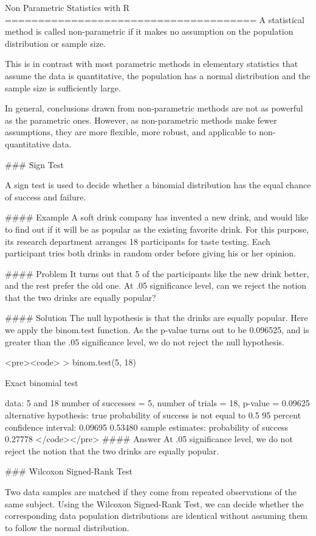 Non Parametric Statistics with R
======================================
A statistical method is called non-parametric if it makes no assumption on the population distribution or sample size.

This is in contrast with most parametric methods in elementary statistics that assume the data is quantitative, the population has a normal distribution and the sample size is sufficiently large.

In general, conclusions drawn from non-parametric methods are not as powerful as the parametric ones. 
However, as non-parametric methods make fewer assumptions, they are more flexible, more robust, and applicable to non-quantitative data.

### Sign Test

A sign test is used to decide whether a binomial distribution has the equal chance of success and failure.

#### Example
A soft drink company has invented a new drink, and would like to find out if it will be as popular as the existing favorite drink. For this purpose, its research department arranges 18 participants for taste testing. Each participant tries both drinks in random order before giving his or her opinion.

#### Problem
It turns out that 5 of the participants like the new drink better, and the rest prefer the old one. At .05 significance level, can we reject the notion that the two drinks are equally popular?

#### Solution
The null hypothesis is that the drinks are equally popular. Here we apply the binom.test function. As the p-value turns out to be 0.096525, and is greater than the .05 significance level, we do not reject the null hypothesis.

<pre><code>
> binom.test(5, 18) 
 
        Exact binomial test 
 
data:  5 and 18 
number of successes = 5, number of trials = 18, 
p-value = 0.09625 
alternative hypothesis: true probability of success is not equal to 0.5 
95 percent confidence interval: 
 0.09695 0.53480 
sample estimates: 
probability of success 
               0.27778
</code></pre>               
#### Answer
At .05 significance level, we do not reject the notion that the two drinks are equally popular.

### Wilcoxon Signed-Rank Test

Two data samples are matched if they come from repeated observations of the same subject. Using the Wilcoxon Signed-Rank Test, we can decide whether the corresponding data population distributions are identical without assuming them to follow the normal distribution.

